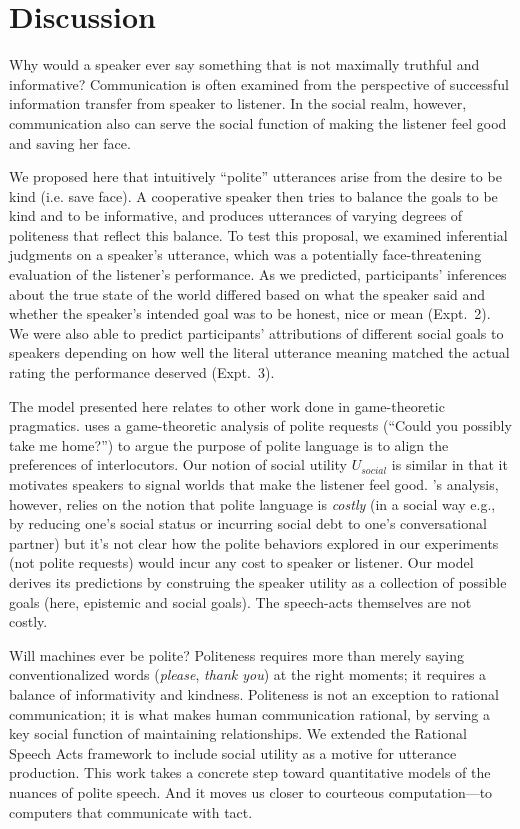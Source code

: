 \documentclass[10pt,letterpaper]{article}
\begin{document}
\section{Discussion}

Why would a speaker ever say something that is not maximally truthful and informative?
Communication is often examined from the perspective of successful information transfer from speaker to listener.
In the social realm, however, communication also can serve the social function of making the listener feel good and saving her face.

We proposed here that intuitively ``polite'' utterances arise from the desire to be kind (i.e. save face). 
A cooperative speaker then tries to balance the goals to be kind and to be informative, and produces utterances of varying degrees of politeness that reflect this balance.
To test this proposal, we examined inferential judgments on a speaker's utterance, which was a potentially face-threatening evaluation of the listener's performance.
As we predicted, participants' inferences about the true state of the world differed based on what the speaker said and whether the speaker's intended goal was to be honest, nice or mean (Expt.~2).
We were also able to predict participants' attributions of different social goals to speakers depending on
how well the literal utterance meaning matched the actual rating the performance deserved (Expt.~3).

The model presented here relates to other work done in game-theoretic pragmatics.
 uses a game-theoretic analysis of polite requests (``Could you possibly take me home?'') to argue the purpose of polite language is to align the preferences of interlocutors. 
Our notion of social utility $U_{social}$ is similar in that it motivates speakers to signal worlds that make the listener feel good. 
\citeauthor{VanRooy2003}'s analysis, however, relies on the notion that polite language is \emph{costly} (in a social way e.g., by reducing one's social status or incurring social debt to one's conversational partner) but it's not clear how the polite behaviors explored in our experiments (not polite requests) would incur any cost to speaker or listener. 
Our model derives its predictions by construing the speaker utility as a collection of possible goals (here, epistemic and social goals). The speech-acts themselves are not costly. 



Will machines ever be polite?
Politeness requires more than merely saying conventionalized words (\emph{please}, \emph{thank you}) at the right moments; it requires a balance of informativity and kindness.
Politeness is not an exception to rational communication; it is what makes human communication rational, by serving a key social function of maintaining relationships.
We extended the Rational Speech Acts framework to include social utility as a motive for utterance production.
This work takes a concrete step toward quantitative models of the nuances of polite speech.
And it moves us closer to courteous computation---to computers that communicate with tact.
\end{document}
